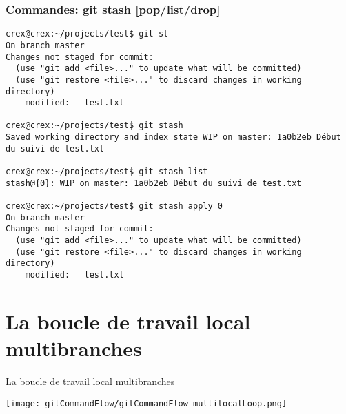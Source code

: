 \documentclass{beamer}
\begin{document}
\begin{frame}[fragile]
\frametitle{Commandes: git stash [pop/list/drop]}

\begin{mdframed}[style=Bash]
    \begin{lstlisting}[style=Bash, caption={Exemple de fonctionnement du stash}]
crex@crex:~/projects/test$ git st
On branch master
Changes not staged for commit:
  (use "git add <file>..." to update what will be committed)
  (use "git restore <file>..." to discard changes in working directory)
	modified:   test.txt
	
crex@crex:~/projects/test$ git stash
Saved working directory and index state WIP on master: 1a0b2eb Début du suivi de test.txt

crex@crex:~/projects/test$ git stash list
stash@{0}: WIP on master: 1a0b2eb Début du suivi de test.txt

crex@crex:~/projects/test$ git stash apply 0
On branch master
Changes not staged for commit:
  (use "git add <file>..." to update what will be committed)
  (use "git restore <file>..." to discard changes in working directory)
	modified:   test.txt
    \end{lstlisting}
\end{mdframed}
\end{frame}


\section{La boucle de travail local multibranches}
\begin{frame}{La boucle de travail local multibranches}
\begin{center}
	\texttt{[image: gitCommandFlow/gitCommandFlow\_multilocalLoop.png]}
\end{center}
\end{frame}
\end{document}
